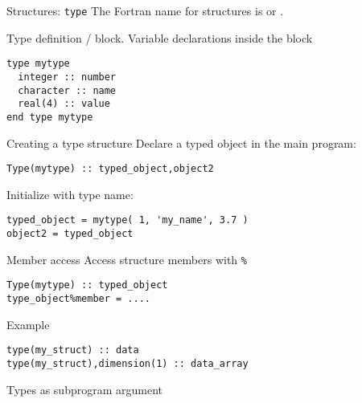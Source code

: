 
\begin{block}{Structures: \noexpand\texttt{type}}
  \label{sl:ftype}
  The Fortran name for structures is  or
  .
\end{block}

\begin{block}{Type definition}
  \label{sl:ftype-def}
   /  block.
  Variable declarations inside the block
\begin{verbatim}
type mytype
  integer :: number
  character :: name
  real(4) :: value
end type mytype
\end{verbatim}
\end{block}

\begin{block}{Creating a type structure}
  \label{sl:ftype-set}
  Declare a typed object in the main program:
\begin{verbatim}
Type(mytype) :: typed_object,object2
\end{verbatim}
 Initialize with type name:
\begin{verbatim}
typed_object = mytype( 1, 'my_name', 3.7 )
object2 = typed_object
\end{verbatim}
\end{block}

\begin{block}{Member access}
  \label{sl:ftype-access}
  Access structure members with \verb+%+
\begin{verbatim}
Type(mytype) :: typed_object
type_object%member = ....  
\end{verbatim}
\end{block}

\begin{block}{Example}
  \label{sl:ftype-ex}
\end{block}

\begin{verbatim}
type(my_struct) :: data
type(my_struct),dimension(1) :: data_array
\end{verbatim}

\begin{block}{Types as subprogram argument}
  \label{sl:ftype-pass}
\end{block}
